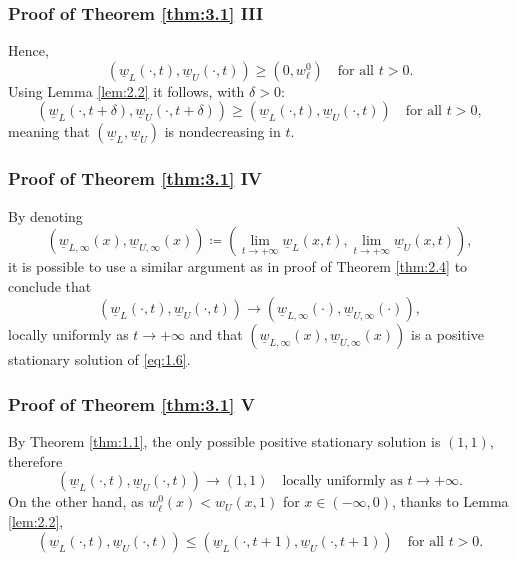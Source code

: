 
\begin{frame}
    \frametitle{Proof of Theorem \ref{thm:3.1} III}
    \begin{proofc}
        Hence,
        \begin{equation*}
            (\underline{w}_L(\cdot, t), \underline{w}_U(\cdot, t)) \geq (0, w_\ell^0) \quad \text{for all } t > 0.
        \end{equation*}
        Using Lemma \ref{lem:2.2} it follows, with \(\delta > 0\):
        \begin{equation*}
            (\underline{w}_L(\cdot, t + \delta), \underline{w}_U(\cdot, t + \delta)) \geq (\underline{w}_L(\cdot, t), \underline{w}_U(\cdot, t)) \quad \text{for all } t > 0,
        \end{equation*}
        meaning that \((\underline{w}_L, \underline{w}_U)\) is nondecreasing in \(t\). 
    \end{proofc}
\end{frame}


\begin{frame}
    \frametitle{Proof of Theorem \ref{thm:3.1} IV}
    \begin{proofc}
        By denoting 
        \[
            \left(\underline{w}_{L, \infty}(x), \underline{w}_{U, \infty}(x)\right) \coloneqq \left(\lim_{t \to +\infty} \underline{w}_L(x, t), \lim_{t \to +\infty} \underline{w}_U(x, t)\right), 
        \]
        it is possible to use a similar argument as in proof of Theorem \ref{thm:2.4} to conclude that
        \[
            (\underline{w}_{L}(\cdot, t), \underline{w}_{U}(\cdot, t)) \to (\underline{w}_{L, \infty}(\cdot), \underline{w}_{U, \infty}(\cdot)),
        \]
        locally uniformly as \(t \to +\infty\) and that \((\underline{w}_{L, \infty}(x), \underline{w}_{U, \infty}(x))\) is a positive stationary solution of \eqref{eq:1.6}. 
    \end{proofc}
\end{frame}


\begin{frame}
    \frametitle{Proof of Theorem \ref{thm:3.1} V}
    \begin{proofc}
        By Theorem \ref{thm:1.1}, the only possible positive stationary solution is \((1, 1)\), therefore
        \begin{equation}
            (\underline{w}_{L}(\cdot, t), \underline{w}_{U}(\cdot, t)) \to (1, 1) \quad \text{locally uniformly as } t \to +\infty.
            \label{eq:3.4}
        \end{equation}
        On the other hand, as \(w_\ell^0(x) < w_U(x, 1)\) for \(x \in (-\infty, 0)\), thanks to Lemma \ref{lem:2.2},
        \[
            (\underline{w}_L(\cdot, t), \underline{w}_U(\cdot, t)) \leq (\underline{w}_L(\cdot, t + 1), \underline{w}_U(\cdot, t + 1)) \quad \text{for all } t > 0.
        \]
    \end{proofc}
\end{frame}

